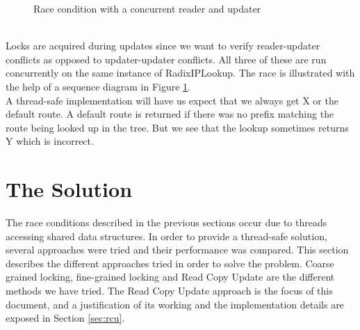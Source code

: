 \documentclass[12pt,a4paper]{article}
\begin{document}
\begin{figure}[tph]
\caption{Race condition with a concurrent reader and updater}
\label{race_readerfigure}
\end{figure}
\\
Locks are acquired during updates since we want to verify reader-updater conflicts as opposed to updater-updater conflicts. All three of these are run concurrently on the same instance of RadixIPLookup. The race is illustrated with the help of a sequence diagram in Figure \ref{race_readerfigure}.\\

A thread-safe implementation will have us expect that we always get X or the default route. A default route is returned if there was no prefix matching the route being looked up in the tree. But we see that the lookup sometimes returns Y which is incorrect.
\section{The Solution}
\label{sec:solution}
The race conditions described in the previous sections occur due to threads accessing shared data structures. In order to provide a thread-safe solution, several approaches were tried and their performance was compared. This section describes the different approaches tried in order to solve the problem. Coarse grained locking, fine-grained locking and Read Copy Update are the different methods we have tried. The Read Copy Update approach is the focus of this document, and a justification of its working and the implementation details are exposed in Section \ref{sec:rcu}.
\end{document}

